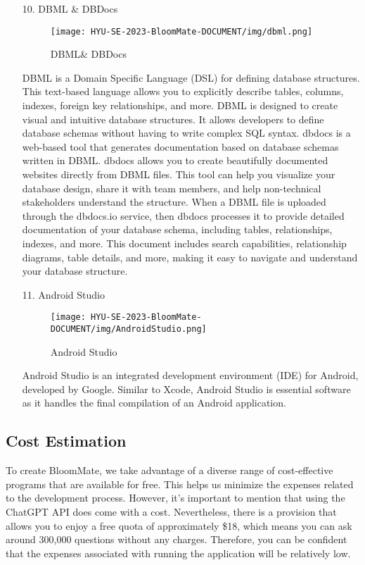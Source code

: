 \documentclass[conference, a4paper]{IEEEtran}
\begin{document}
\begin{enumerate}
    \item[10.]DBML \& DBDocs
    \begin{figure}[h]
    \centering
    \texttt{[image: HYU-SE-2023-BloomMate-DOCUMENT/img/dbml.png]}
    \label{fig:DBML}
    \caption{DBML\& DBDocs} 
    \end{figure} 
    \item[] DBML is a Domain Specific Language (DSL) for defining database structures. This text-based language allows you to explicitly describe tables, columns, indexes, foreign key relationships, and more. DBML is designed to create visual and intuitive database structures. It allows developers to define database schemas without having to write complex SQL syntax. dbdocs is a web-based tool that generates documentation based on database schemas written in DBML. dbdocs allows you to create beautifully documented websites directly from DBML files. This tool can help you visualize your database design, share it with team members, and help non-technical stakeholders understand the structure. When a DBML file is uploaded through the dbdocs.io service, then dbdocs processes it to provide detailed documentation of your database schema, including tables, relationships, indexes, and more. This document includes search capabilities, relationship diagrams, table details, and more, making it easy to navigate and understand your database structure.\\
    
    
    \item[11.]Android Studio
    \begin{figure}[h]
    \centering
    \texttt{[image: HYU-SE-2023-BloomMate-DOCUMENT/img/AndroidStudio.png]}
    \label{fig:AndroidStudio}
    \caption{Android Studio} 
    \end{figure}
    \item[]Android Studio is an integrated development environment (IDE) for Android, developed by Google. Similar to Xcode, Android Studio is essential software as it handles the final compilation of an Android application.\\
\end{enumerate}


\subsection{Cost Estimation}
To create BloomMate, we take advantage of a diverse range of cost-effective programs that are available for free. This helps us minimize the expenses related to the development process. However, it's important to mention that using the ChatGPT API does come with a cost. Nevertheless, there is a provision that allows you to enjoy a free quota of approximately \$18, which means you can ask around 300,000 questions without any charges. Therefore, you can be confident that the expenses associated with running the application will be relatively low.\\
\newpage
\end{document}
